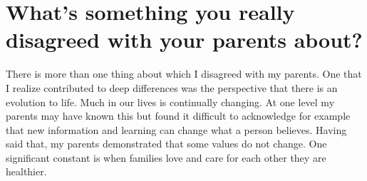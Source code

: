 \section{What's something you really disagreed with your parents about?}

There is more than one thing about which I disagreed with my parents.
One that I realize contributed to deep differences was the perspective that there is an evolution to life.
Much in our lives is continually changing.
At one level my parents may have known this but found it difficult to acknowledge for example that new information and learning can change what a person believes.
Having said that, my parents demonstrated that some values do not change.
One significant constant is when families love and care for each other they are healthier.

